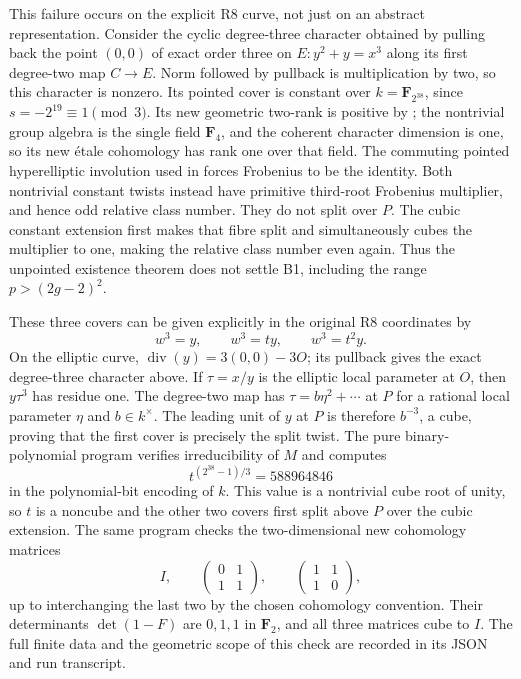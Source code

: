 This failure occurs on the explicit R8 curve, not just on an
abstract representation. Consider the cyclic degree-three
character obtained by pulling back the point $(0,0)$ of exact
order three on $E:y^2+y=x^3$ along its first degree-two map
$C\to E$. Norm followed by pullback is multiplication by two,
so this character is nonzero. Its pointed cover is constant over
$k=\mathbf F_{2^{38}}$, since $s=-2^{19}\equiv1\pmod3$.
Its new geometric two-rank is positive by ;
the nontrivial group algebra is the single field $\mathbf F_4$,
and the coherent character dimension is one, so its new
\'etale cohomology has rank one over that field. The commuting
pointed hyperelliptic involution used in 
forces Frobenius to be the identity. Both nontrivial constant
twists instead have primitive third-root Frobenius multiplier,
and hence odd relative class number. They do not split over $P$.
The cubic constant extension first makes that fibre split and
simultaneously cubes the multiplier to one, making the relative
class number even again. Thus the unpointed existence theorem
does not settle B1, including the range $p>(2g-2)^2$.

These three covers can be given explicitly in the original R8
coordinates by
\[
       w^3=y,\qquad w^3=ty,\qquad w^3=t^2y.
\]
On the elliptic curve, $\operatorname{div}(y)=3(0,0)-3O$;
its pullback gives the exact degree-three character above.
If $\tau=x/y$ is the elliptic local parameter at $O$, then
$y\tau^3$ has residue one. The degree-two map has
$\tau=b\eta^2+\cdots$ at $P$ for a rational local parameter
$\eta$ and $b\in k^\times$. The leading unit of $y$ at $P$
is therefore $b^{-3}$, a cube, proving that the first cover
is precisely the split twist.
The pure binary-polynomial program
 verifies irreducibility
of $M$ and computes
\[
        t^{(2^{38}-1)/3}=588964846
\]
in the polynomial-bit encoding of $k$. This value is a nontrivial
cube root of unity, so $t$ is a noncube and the other two covers
first split above $P$ over the cubic extension. The same program
checks the two-dimensional new cohomology matrices
\[
 I,\qquad
 \begin{pmatrix}0&1\\1&1\end{pmatrix},\qquad
 \begin{pmatrix}1&1\\1&0\end{pmatrix},
\]
up to interchanging the last two by the chosen cohomology
convention. Their determinants $\det(1-F)$ are $0,1,1$ in
$\mathbf F_2$, and all three matrices cube to $I$.
The full finite data and the geometric scope of this check are
recorded in its JSON and run transcript.
